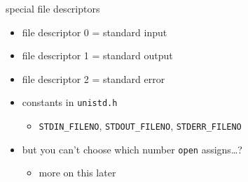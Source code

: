 

\begin{frame}{special file descriptors}
\begin{itemize}
\item file descriptor 0 = standard input
\item file descriptor 1 = standard output
\item file descriptor 2 = standard error
\vspace{.5cm}
\item constants in \texttt{unistd.h}
    \begin{itemize} \item \texttt{STDIN\_FILENO}, \texttt{STDOUT\_FILENO}, \texttt{STDERR\_FILENO} \end{itemize}
\vspace{.5cm}
\item<2-> but you can't choose which number \texttt{open} assigns\ldots?
    \begin{itemize}
    \item more on this later
    \end{itemize}
\end{itemize}
\end{frame}

